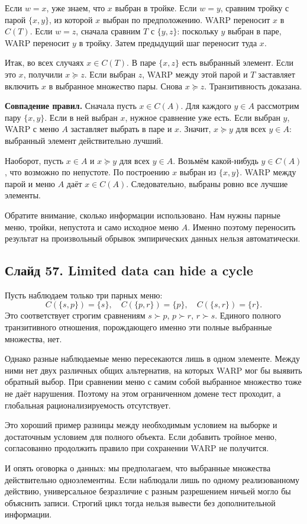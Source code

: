 \documentclass[11pt,a4paper]{article}
\newcommand{\slide}[2]{\subsection*{\textcolor{NESblue}{Слайд #1.} #2}\pdfbookmark[2]{Слайд #1. #2}{script-#1}\hypertarget{script-#1}{}}
\begin{document}
Если $w=x$, уже знаем, что $x$ выбран в тройке. Если $w=y$, сравним тройку с парой $\{x,y\}$, из которой $x$ выбран по предположению. WARP переносит $x$ в $C(T)$. Если $w=z$, сначала сравним $T$ с $\{y,z\}$: поскольку $y$ выбран в паре, WARP переносит $y$ в тройку. Затем предыдущий шаг переносит туда $x$.

Итак, во всех случаях $x\in C(T)$. В паре $\{x,z\}$ есть выбранный элемент. Если это $x$, получили $x\succeq z$. Если выбран $z$, WARP между этой парой и $T$ заставляет включить $x$ в выбранное множество пары. Снова $x\succeq z$. Транзитивность доказана.

\textbf{Совпадение правил.} Сначала пусть $x\in C(A)$. Для каждого $y\in A$ рассмотрим пару $\{x,y\}$. Если в ней выбран $x$, нужное сравнение уже есть. Если выбран $y$, WARP с меню $A$ заставляет выбрать в паре и $x$. Значит, $x\succeq y$ для всех $y\in A$: выбранный элемент действительно лучший.

Наоборот, пусть $x\in A$ и $x\succeq y$ для всех $y\in A$. Возьмём какой-нибудь $y\in C(A)$, что возможно по непустоте. По построению $x$ выбран из $\{x,y\}$. WARP между парой и меню $A$ даёт $x\in C(A)$. Следовательно, выбраны ровно все лучшие элементы.

Обратите внимание, сколько информации использовано. Нам нужны парные меню, тройки, непустота и само исходное меню $A$. Именно поэтому переносить результат на произвольный обрывок эмпирических данных нельзя автоматически.

\slide{57}{Limited data can hide a cycle}
Пусть наблюдаем только три парных меню:
\[
C(\{s,p\})=\{s\},\quad
C(\{p,r\})=\{p\},\quad
C(\{s,r\})=\{r\}.
\]
Это соответствует строгим сравнениям $s\succ p$, $p\succ r$, $r\succ s$. Единого полного транзитивного отношения, порождающего именно эти полные выбранные множества, нет.

Однако разные наблюдаемые меню пересекаются лишь в одном элементе. Между ними нет двух различных общих альтернатив, на которых WARP мог бы выявить обратный выбор. При сравнении меню с самим собой выбранное множество тоже не даёт нарушения. Поэтому на этом ограниченном домене тест проходит, а глобальная рационализируемость отсутствует.

Это хороший пример разницы между необходимым условием на выборке и достаточным условием для полного объекта. Если добавить тройное меню, согласованно продолжить правило при сохранении WARP не получится.

И опять оговорка о данных: мы предполагаем, что выбранные множества действительно одноэлементны. Если наблюдали лишь по одному реализованному действию, универсальное безразличие с разным разрешением ничьей могло бы объяснить записи. Строгий цикл тогда нельзя вывести без дополнительной информации.
\end{document}

